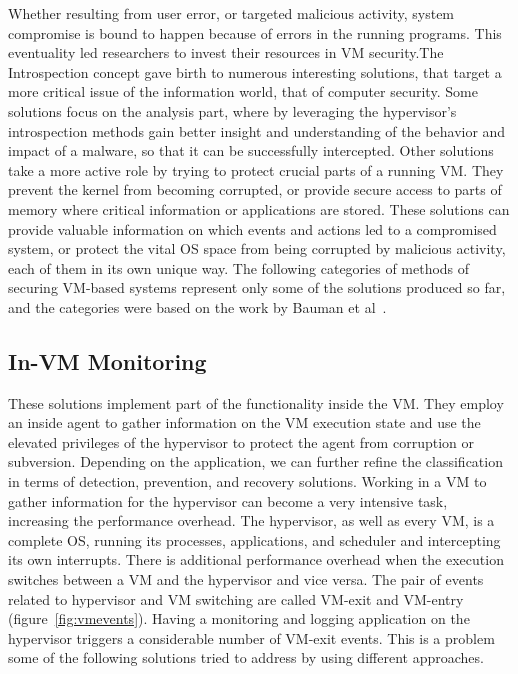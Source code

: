 \par Whether resulting from user error, or targeted malicious activity, system compromise is bound to happen because of errors in the running programs. This eventuality led researchers to invest their resources in \ac{VM} security.The Introspection concept gave birth to numerous interesting solutions, that target a more critical issue of the information world, that of computer security. Some solutions focus on the analysis part, where by leveraging the hypervisor's introspection methods gain better insight and understanding of the behavior and impact of a malware, so that it can be successfully intercepted. Other solutions take a more active role by trying to protect crucial parts of a running \ac{VM}. They prevent the kernel from becoming corrupted, or provide secure access to parts of memory where critical information or applications are stored. 
These solutions can provide valuable information on which events and actions led to a compromised system, or protect the vital \ac{OS} space from being corrupted by malicious activity, each of them in its own unique way. 
The following categories of methods of securing \ac{VM}-based systems represent only some of the solutions produced so far, and the categories were based on the work by Bauman et al~\cite{bauman2015survey}.

\subsection{In-\ac{VM} Monitoring}\label{sub:invm}
These solutions implement part of the functionality inside the \ac{VM}. They employ an inside agent to gather information on the \ac{VM} execution state and use the elevated privileges of the hypervisor to protect the agent from corruption or subversion. Depending on the application, we can further refine the classification in terms of detection, prevention, and recovery solutions. Working in a \ac{VM} to gather information for the hypervisor can become a very intensive task, increasing the performance overhead. The hypervisor, as well as every \ac{VM}, is a complete \ac{OS}, running its processes, applications, and scheduler and intercepting its own interrupts. There is additional performance overhead when the execution switches between a \ac{VM} and the hypervisor and vice versa. The pair of events related to hypervisor and \ac{VM} switching are called VM-exit and VM-entry (figure~\ref{fig:vmevents}). Having a monitoring and logging application on the hypervisor triggers a considerable number of VM-exit events. This is a problem some of the following solutions tried to address by using different approaches.

